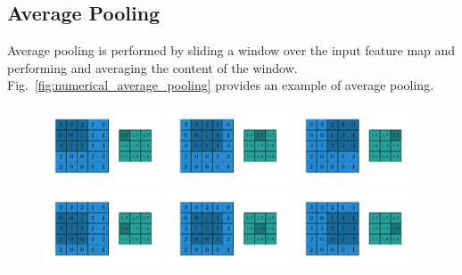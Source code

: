 \subsection{Average Pooling}
Average pooling is performed by sliding a window over the input feature map and performing and averaging the content of the window. Fig.~\ref{fig:numerical_average_pooling}
provides an example of average pooling.
\begin{figure}
    \centering
    \includegraphics[width=0.32\textwidth]{pdf/numerical_average_pooling_00.pdf}
    \includegraphics[width=0.32\textwidth]{pdf/numerical_average_pooling_01.pdf}
    \includegraphics[width=0.32\textwidth]{pdf/numerical_average_pooling_02.pdf}
    \includegraphics[width=0.32\textwidth]{pdf/numerical_average_pooling_03.pdf}
    \includegraphics[width=0.32\textwidth]{pdf/numerical_average_pooling_04.pdf}
    \includegraphics[width=0.32\textwidth]{pdf/numerical_average_pooling_05.pdf}

\end{figure}
